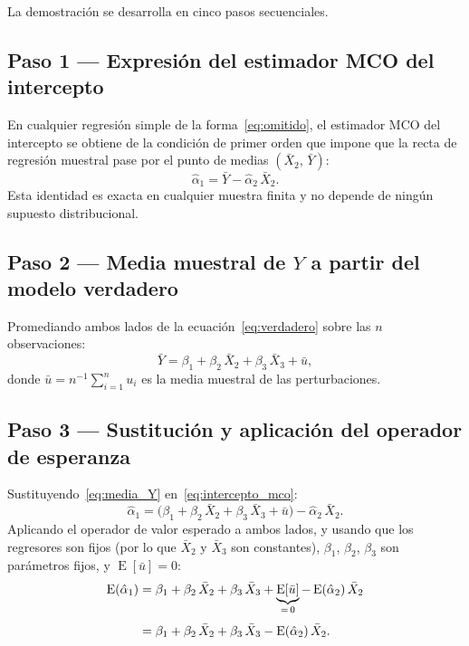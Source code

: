 \documentclass[12pt, letterpaper]{article}
\newcommand{\E}{\operatorname{E}}
\begin{document}
La demostración se desarrolla en cinco pasos secuenciales.

\subsection{Paso 1 --- Expresión del estimador MCO del intercepto}

En cualquier regresión simple de la forma~\eqref{eq:omitido}, el estimador
MCO del intercepto se obtiene de la condición de primer orden que impone
que la recta de regresión muestral pase por el punto de medias
$(\bar{X}_2,\, \bar{Y})$:
\begin{equation}
  \hat{\alpha}_1 = \bar{Y} - \hat{\alpha}_2\,\bar{X}_2.
  \label{eq:intercepto_mco}
\end{equation}
Esta identidad es exacta en cualquier muestra finita y no depende de
ningún supuesto distribucional.

\subsection{Paso 2 --- Media muestral de $Y$ a partir del modelo verdadero}

Promediando ambos lados de la ecuación~\eqref{eq:verdadero} sobre las
$n$ observaciones:
\begin{equation}
  \bar{Y} = \beta_1 + \beta_2\,\bar{X}_2 + \beta_3\,\bar{X}_3 + \bar{u},
  \label{eq:media_Y}
\end{equation}
donde $\bar{u} = n^{-1}\sum_{i=1}^n u_i$ es la media muestral de las
perturbaciones.

\subsection{Paso 3 --- Sustitución y aplicación del operador de esperanza}

Sustituyendo~\eqref{eq:media_Y} en~\eqref{eq:intercepto_mco}:
\[
  \hat{\alpha}_1
  = \bigl(\beta_1 + \beta_2\,\bar{X}_2 + \beta_3\,\bar{X}_3 + \bar{u}\bigr)
    - \hat{\alpha}_2\,\bar{X}_2.
\]
Aplicando el operador de valor esperado a ambos lados, y usando que los
regresores son fijos (por lo que $\bar{X}_2$ y $\bar{X}_3$ son
constantes), $\beta_1$, $\beta_2$, $\beta_3$ son parámetros fijos,
y $\E[\bar{u}] = 0$:
\begin{align}
  \E(\hat{\alpha}_1)
  &= \beta_1 + \beta_2\,\bar{X}_2 + \beta_3\,\bar{X}_3
     + \underbrace{\E[\bar{u}]}_{=\,0}
     - \E(\hat{\alpha}_2)\,\bar{X}_2 \notag\\[4pt]
  &= \beta_1 + \beta_2\,\bar{X}_2 + \beta_3\,\bar{X}_3
     - \E(\hat{\alpha}_2)\,\bar{X}_2.
  \label{eq:paso3}
\end{align}
\end{document}
